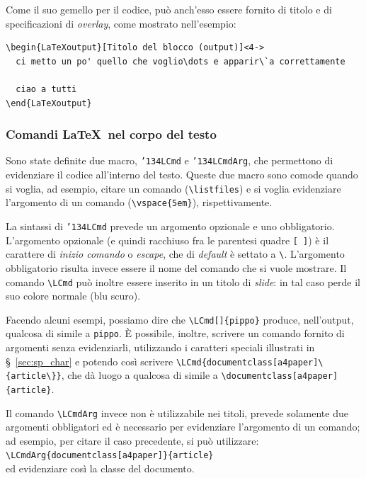 \documentclass[a4paper,10pt]{article}
\newcommand{\bs}{{\char'134}}%
\newcommand{\cmd}[1]{\texttt{\bs #1}}
\begin{document}
Come il suo gemello per il codice, può anch'esso essere fornito di
titolo e di specificazioni di \emph{overlay}, come mostrato
nell'esempio:
\begin{Verbatim}
\begin{LaTeXoutput}[Titolo del blocco (output)]<4->
  ci metto un po' quello che voglio\dots e apparir\`a correttamente
  
  ciao a tutti
\end{LaTeXoutput}
\end{Verbatim}

\subsubsection{Comandi \LaTeX\ nel corpo del testo}
Sono state definite due macro, \cmd{LCmd} e \cmd{LCmdArg}, che
permettono di evidenziare il codice all'interno del testo. Queste due
macro sono comode quando si voglia, ad esempio, citare un comando
(\verb+\listfiles+) e si voglia evidenziare l'argomento di un comando
(\verb+\vspace{5em}+), rispettivamente.

La sintassi di \cmd{LCmd} prevede un argomento opzionale e uno
obbligatorio. L'argomento opzionale (e quindi racchiuso fra le
parentesi quadre \verb+[ ]+) è il carattere di \emph{inizio comando} o
\textit{escape}, che di \textit{default} è settato a \verb+\+.
L'argomento obbligatorio risulta invece essere il nome del comando che
si vuole mostrare. Il comando \verb+\LCmd+ può inoltre essere inserito
in un titolo di \textit{slide}: in tal caso perde il suo colore
normale (blu scuro).

Facendo alcuni esempi, possiamo dire che \verb+\LCmd[]{pippo}+
produce, nell'output, qualcosa di simile a \texttt{pippo}. \`E
possibile, inoltre, scrivere un comando fornito di argomenti senza
evidenziarli, utilizzando i caratteri speciali illustrati in
\S~\ref{sec:sp_char} e potendo così scrivere
\verb+\LCmd{documentclass[a4paper]\{article\}}+, che dà luogo a
qualcosa di simile a \verb+\documentclass[a4paper]{article}+.

Il comando \verb+\LCmdArg+ invece non è utilizzabile nei titoli,
prevede solamente due argomenti obbligatori ed è
necessario per evidenziare l'argomento di un comando; ad esempio, per
citare il caso precedente, si può utilizzare:\\[.5em]
\verb+\LCmdArg{documentclass[a4paper]}{article}+\\[.5em] ed
evidenziare così la classe del documento.
\end{document}
